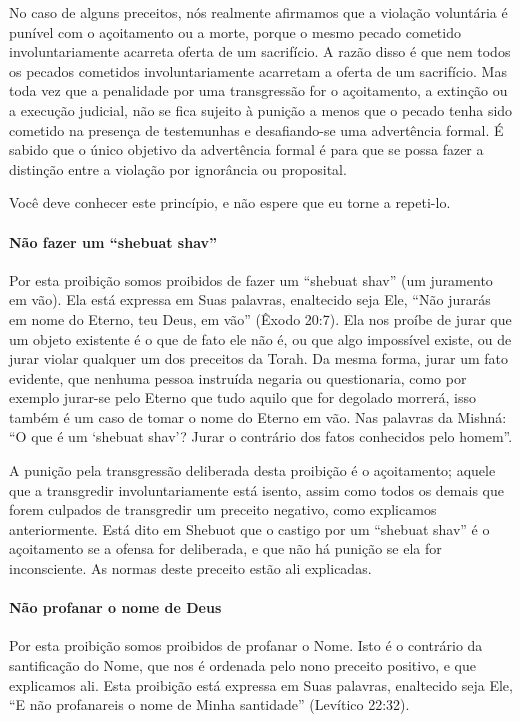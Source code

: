 No caso de alguns preceitos, nós realmente afirmamos que a violação
voluntária é punível com o açoitamento ou a morte, porque o mesmo
pecado cometido involuntariamente acarreta oferta de um sacrifício. A
razão disso é que nem todos os pecados cometidos involuntariamente
acarretam a oferta de um sacrifício. Mas toda vez que a penalidade por
uma transgressão for o açoitamento, a extinção ou a execução judicial,
não se fica sujeito à punição a menos que o pecado tenha sido cometido
na presença de testemunhas e desafiando-se uma advertência formal. É
sabido que o único objetivo da advertência formal é para que se possa
fazer a distinção entre a violação por ignorância ou proposital.

Você deve conhecer este princípio, e não espere que eu torne a repeti-lo.

\paragraph{Não fazer um ``shebuat shav''}

Por esta proibição somos proibidos de fazer um ``shebuat shav'' (um
juramento em vão). Ela está expressa em Suas palavras, enaltecido seja
Ele, ``Não jurarás em nome do Eterno, teu Deus, em vão'' (Êxodo 20:7).
Ela nos proíbe de jurar que um objeto existente é o que de fato ele não
é, ou que algo impossível existe, ou de jurar violar qualquer um dos
preceitos da Torah. Da mesma forma, jurar um fato evidente, que nenhuma
pessoa instruída negaria ou questionaria, como por exemplo jurar-se
pelo Eterno que tudo aquilo que for degolado morrerá, isso também é um
caso de tomar o nome do Eterno em vão. Nas palavras da Mishná: ``O que é
um `shebuat shav'? Jurar o contrário dos fatos conhecidos pelo homem''.

A punição pela transgressão deliberada desta proibição é o açoitamento;
aquele que a transgredir involuntariamente está isento, assim como
todos os demais que forem culpados de transgredir um preceito negativo,
como explicamos anteriormente. Está dito em Shebuot que o castigo por um
``shebuat shav'' é o açoitamento se a ofensa for deliberada, e que não
há punição se ela for inconsciente. As normas deste preceito estão ali
explicadas.

\paragraph{Não profanar o nome de Deus}

Por esta proibição somos proibidos de profanar o Nome. Isto é o
contrário da santificação do Nome, que nos é ordenada pelo nono preceito
positivo, e que explicamos ali. Esta proibição está expressa em Suas
palavras, enaltecido seja Ele, ``E não profanareis o nome de Minha
santidade'' (Levítico 22:32).

